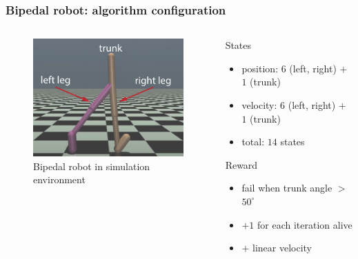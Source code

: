 \begin{frame}
	\frametitle{Bipedal robot: algorithm configuration}
	
	\begin{columns}
	\begin{column}{.5\textwidth}
	\begin{figure}
		\centering
		\includegraphics{bipedal_robot.pdf}
		\caption{Bipedal robot in simulation environment}
	\end{figure}
	\end{column}
	
	\begin{column}{.5\textwidth}
			\begin{exampleblock}{States}
				\begin{itemize}
					\item position: $6$ (left, right) $+$ $1$ (trunk)
					\item velocity: $6$ (left, right) $+$ $1$ (trunk)
					\item total: $14$ states
				\end{itemize}
			\end{exampleblock}

			\begin{exampleblock}{Reward}
				\begin{itemize}
					\item fail when trunk angle $>$ $50^{\circ}$
					\item $+1$ for each iteration alive
					\item $+$ linear velocity
				\end{itemize}
				
			\end{exampleblock}		
	\end{column}
	\end{columns}
\end{frame}


